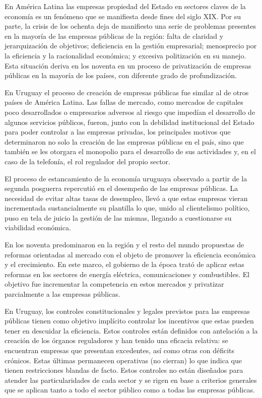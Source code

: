 \documentclass[
  12pt,
  spanish,
]{book}
\begin{document}
En América Latina las empresas propiedad del Estado en sectores claves
de la economía es un fenómeno que se manifiesta desde fines del siglo
XIX. Por su parte, la crisis de los ochenta deja de manifiesto una serie
de problemas presentes en la mayoría de las empresas públicas de la
región: falta de claridad y jerarquización de objetivos; deficiencia en
la gestión empresarial; menosprecio por la eficiencia y la racionalidad
económica; y excesiva politización en su manejo. Esta situación deriva
en los noventa en un proceso de privatización de empresas públicas en la
mayoría de los países, con diferente grado de profundización.

En Uruguay el proceso de creación de empresas públicas fue similar al de
otros países de América Latina. Las fallas de mercado, como mercados de
capitales poco desarrollados o empresarios adversos al riesgo que
impedían el desarrollo de algunos servicios públicos, fueron, junto con
la debilidad institucional del Estado para poder controlar a las
empresas privadas, los principales motivos que determinaron no solo la
creación de las empresas públicas en el país, sino que también se les
otorgara el monopolio para el desarrollo de sus actividades y, en el
caso de la telefonía, el rol regulador del propio sector.

El proceso de estancamiento de la economía uruguaya observado a partir
de la segunda posguerra repercutió en el desempeño de las empresas
públicas. La necesidad de evitar altas tasas de desempleo, llevó a que
estas empresas vieran incrementada sustancialmente su plantilla lo que,
unido al clientelismo político, puso en tela de juicio la gestión de las
mismas, llegando a cuestionarse su viabilidad económica.

En los noventa predominaron en la región y el resto del mundo propuestas
de reformas orientadas al mercado con el objeto de promover la
eficiencia económica y el crecimiento. En este marco, el gobierno de la
época trató de aplicar estas reformas en los sectores de energía
eléctrica, comunicaciones y combustibles. El objetivo fue incrementar la
competencia en estos mercados y privatizar parcialmente a las empresas
públicas.

En Uruguay, los controles constitucionales y legales previstos para las
empresas públicas tienen como objetivo implícito controlar los
incentivos que estas pueden tener en descuidar la eficiencia. Estos
controles están definidos con antelación a la creación de los órganos
reguladores y han tenido una eficacia relativa: se encuentran empresas
que presentan excedentes, así como otras con déficits crónicos. Estas
últimas permanecen operativas (no cierran) lo que indica que tienen
restricciones blandas de facto. Estos controles no están diseñados para
atender las particularidades de cada sector y se rigen en base a
criterios generales que se aplican tanto a todo el sector público como a
todas las empresas públicas.
\end{document}
